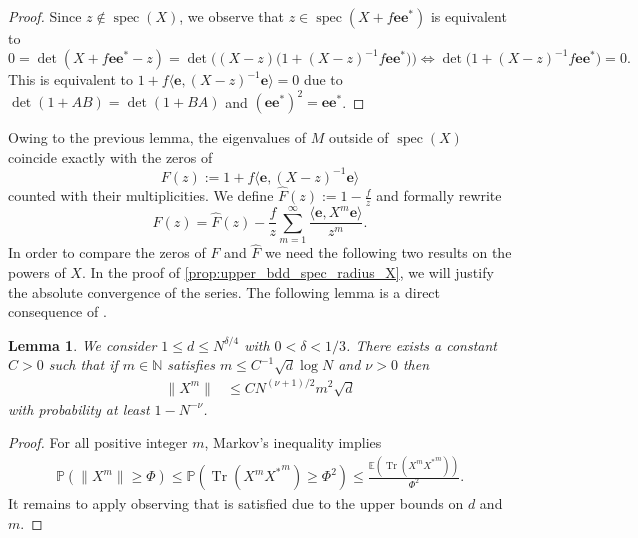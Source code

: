 \documentclass[10pt,a4paper]{amsart}
\DeclareMathOperator{\Tr}{Tr}
\DeclareMathOperator{\spec}{spec}
\newcommand{\N}{\mathbb{N}}
\newtheorem{lemma}{Lemma}[section]
\numberwithin{equation}{section}
\begin{document}
\begin{proof} 
Since $z \notin \spec(X)$, we observe that $z \in \spec(X + f \mathbf e \mathbf e^*)$ is equivalent to  
\[ 
0 = \det(X + f \mathbf e \mathbf e^*- z) = \det\big( (X-z) \big( 1 + (X-z)^{-1} f \mathbf e \mathbf e^*\big)\big) \iff \det\big( 1 + (X-z)^{-1} f \mathbf e \mathbf e^*\big) = 0.
\] 
This is equivalent to $1 + f\langle \mathbf e, (X-z)^{-1} \mathbf e \rangle =0$ due to 
$\det(1 + AB) = \det(1 + BA)$ and $(\mathbf e \mathbf e^*)^2 =\mathbf e \mathbf e^*$. 
\end{proof} 
 Owing to the previous lemma, the eigenvalues of $M$ outside of $\spec(X)$ coincide exactly with the zeros  of 
\begin{equation} \label{eq:def_spectral_function1}  
F(z) := 1 + f \langle \mathbf e , (X-z)^{-1} \mathbf e \rangle 
\end{equation}
counted with their multiplicities. 
We define $\widehat{F}(z) := 1-\frac{f}{z}$ and formally rewrite 
\begin{equation}\label{eq:def_spectral_funct}
    F(z) = \widehat{F}(z) - \frac{f}{z}\sum_{m=1}^{\infty}\frac{\langle \mathbf{e}, X^m \mathbf{e} \rangle }{z^m }.
\end{equation}
In order to compare the zeros of $F$ and $\widehat{F}$ we need the following two results on the powers of $X$. In the proof of \cref{prop:upper_bdd_spec_radius_X}, we will justify the absolute convergence of the series. The following lemma is a direct consequence of \cite[Proposition 6.1]{BBK_spec_radii}.
\begin{lemma} \label{lem:norm_X_m} 
We consider $1 \le d \le N^{\delta/4}$ with $0<\delta < 1/3$. There exists a constant $C>0$ such that if $m \in \N$ satisfies $m \le  C^{-1} \sqrt{d} \log N$ and $\nu>0$ then 
    \begin{align*}
    \|X^m \| &\le C N^{ (\nu+1)/2} m^2 \sqrt{d}
    \end{align*}
    with probability at least $1 - N^{- \nu}$.
    \end{lemma} 

\begin{proof}
    For all positive integer $m$, Markov's inequality implies 
    \begin{align*}
        \mathbb{P} \left( \|X^m\| \ge \Phi \right) \le \mathbb{P} \left( \Tr(X^m {X^\ast}^m ) \ge \Phi^2  \right)   \le \frac{\mathbb{E}\left(\Tr(X^m {X^\ast}^m ) \right)}{\Phi^2}.
    \end{align*}
    It remains to apply \cite[Proposition 6.1]{BBK_spec_radii}
    observing that \cite[(5.1)]{BBK_spec_radii} is satisfied due to 
    the upper bounds on $d$ and $m$.
\end{proof}
\end{document}
